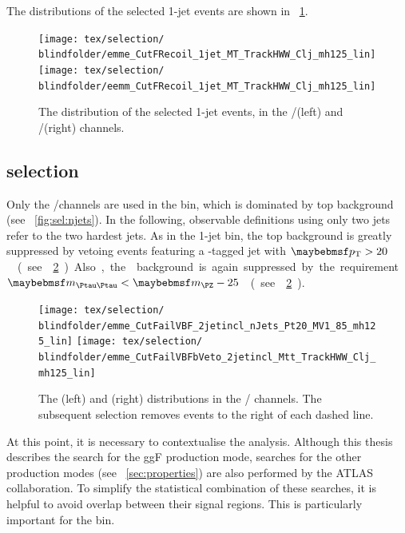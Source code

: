 The \mt distributions of the selected 1-jet events are shown in \Figure~\ref{fig:sel:1j:mt}.

\begin{figure}[t]
	\texttt{[image: tex/selection/\\blindfolder/emme\_CutFRecoil\_1jet\_MT\_TrackHWW\_Clj\_mh125\_lin]}
	\hfill
	\texttt{[image: tex/selection/\\blindfolder/eemm\_CutFRecoil\_1jet\_MT\_TrackHWW\_Clj\_mh125\_lin]}
	\caption{The \mt distribution of the selected 1-jet events, in the \emch/\mech (left) and 
	\eech/\mmch (right) channels.}
	\label{fig:sel:1j:mt}
\end{figure}



\subsection{\twojet selection}
\label{sec:selection:2j}

Only the \emch/\mech channels are used in the \twojet bin, which is dominated by top 
background (see \Figure~\ref{fig:sel:njets}). In the following, observable definitions using 
only two jets refer to the two hardest jets. As in the 1-jet bin, the top background is 
greatly suppressed by vetoing events featuring a \Pbottom-tagged jet with 
\unit{$\pt > 20$}{\GeV} (see \Figure~\ref{fig:sel:2j:df_cuts}). Also, the \DYtt background 
is again suppressed by the requirement \unit{$\mtautau < \mZ - 25$}{\GeV} (see 
\Figure~\ref{fig:sel:2j:df_cuts}).

\begin{figure}[t]
	\texttt{[image: tex/selection/\\blindfolder/emme\_CutFailVBF\_2jetincl\_nJets\_Pt20\_MV1\_85\_mh125\_lin]}
	\hfill
	\texttt{[image: tex/selection/\\blindfolder/emme\_CutFailVBFbVeto\_2jetincl\_Mtt\_TrackHWW\_Clj\_mh125\_lin]}
	\caption{The \nbjets (left) and \mtautau (right) distributions in the \emch/\mech 
	channels. The subsequent selection removes events to the right of each dashed line.}
	\label{fig:sel:2j:df_cuts}
\end{figure}

At this point, it is necessary to contextualise the analysis. Although this thesis 
describes the search for the ggF production mode, searches for the other production modes 
(see \Section~\ref{sec:properties}) are also performed by the ATLAS collaboration. To 
simplify the statistical combination of these searches, it is helpful to avoid overlap 
between their signal regions. This is particularly important for the \twojet bin.

